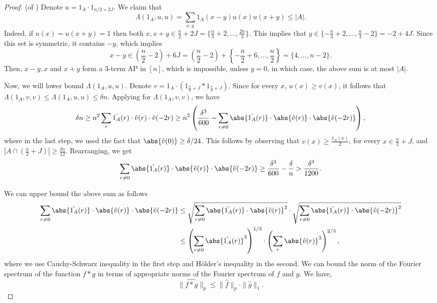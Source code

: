 \documentclass{article}
\begin{document}
\begin{proof}(of )
Denote $u = 1_A\cdot1_{n/2+2J}$. 
We claim that 
$$\Lambda(1_A,u,u)  = \sum_{x,y}1_A(x-y)u(x)u(x+y) \leq |A|.$$ 
Indeed, if $u(x) = u(x+y) = 1$ then both $x,x+y\in \frac{n}{2}+2J = \{\frac{n}{3}+2,\ldots,\frac{2n}{3}\}$. 
This implies that $y\in \{-\frac{n}{3}+2,\ldots,\frac{n}{3}-2\} = -2 + 4J$. 
Since this set is symmetric, it contains $-y$, which implies
$$x-y \in \left(\frac{n}{2} - 2\right) + 6J =\left(\frac{n}{2} - 2\right) + \left\{-\frac{n}{2}+6,\ldots,\frac{n}{2}\right\} = \{4,\ldots,n-2\}.$$ 
Then, $x-y,x$ and $x+y$ form a 3-term AP in $[n]$, which is impossible, unless $y=0$, in which case, the above sum is at most $|A|$. 

Now, we will lower bound $\Lambda(1_A,u,u)$. 
Denote $v= 1_A\cdot(1_{\frac{n}{2}+J}\ast1_{\frac{n}{2}+J})$. 
Since for every $x$, $u(x) \geq v(x)$, it follows that $\Lambda(1_A,v,v) \leq \Lambda(1_A,u,u) \leq \delta n$. Applying  for $\Lambda(1_A,v,v)$, we have
\begin{align*}
\delta n
\geq n^2\sum_{r }\hat{1_A}(r)\cdot\hat{v}(r)\cdot \hat{v}(-2r) 
\geq n^2\left(\frac{\delta^3}{600} - \sum_{r\neq 0}\abs{\hat{1_A}(r)}\cdot\abs{\hat{v}(r)}\cdot \abs{\hat{v}(-2r)}\right),
\end{align*}
where in the last step, we used the fact that $\abs{\hat{v}(0)} \geq \delta/24$.
This follows by observing that $v(x) \geq \frac{1_A(x)}{2}$, for every $x\in \frac{n}{2} + J$, and $|A\cap(\frac{n}{2} + J)| \geq  \frac{\delta n}{12}$.
Rearranging, we get 
$$\sum_{r\neq 0}\abs{\hat{1_A}(r)}\cdot\abs{\hat{v}(r)}\cdot\abs{\hat{v}(-2r)} \geq  \frac{\delta^3}{600} - \frac{\delta}{n} > \frac{\delta^3}{1200}.$$
 
We can upper bound the above sum as follows
\begin{align*}
    \sum_{r\neq 0}\abs{\hat{1_A}(r)}\cdot\abs{\hat{v}(r)}\cdot\abs{\hat{v}(-2r)} &\leq \sqrt{\sum_{r\neq 0}\abs{\hat{1_A}(r)}\cdot\abs{\hat{v}(r)}^2}\cdot \sqrt{\sum_{r\neq 0}\abs{\hat{1_A}(r)}\cdot\abs{\hat{v}(-2r)}^2}\\
    &\leq \left(\sum_{r\neq 0} \abs{\hat{1_A}(r)}^3\right)^{1/3}\cdot\left(\sum_{r}\abs{\hat{v}(r)}^3\right)^{2/3},
\end{align*}
where we use Cauchy-Schwarz inequality in the first step and H\"older's inequality in the second. We can bound the norm of the Fourier spectrum of the function $f\ast g$ in terms of appropriate norms of the Fourier spectrum of $f$ and $g$. We have,
\begin{equation}\label{eq:Young-ineq-special-case}
\|\hat{f\ast g}\|_p \leq \|\hat{f}\|_p\cdot\|\hat{g}\|_1.
\end{equation}


\end{proof}
\end{document}
